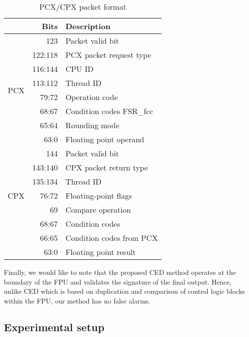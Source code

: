 \documentclass[12pt]{yalephd}
\begin{document}
\begin{table}[!ht]
\caption{PCX/CPX packet format}\label{sC3tPCXCPXPacket}
\begin{center}
\begin{threeparttable}[b]
\begin{tabular}{||r|r|l||}
\hline
\hline
& {\bf Bits} & {\bf Description} \\
\hline
\hline
\multirow{8}{*}{PCX} & 123 & Packet valid bit \\
\cline{2-3}
& 122:118 & PCX packet request type\\
\cline{2-3}
& 116:144 & CPU ID \\
\cline{2-3}
& 113:112 & Thread ID \\
\cline{2-3}
& 79:72 & Operation code \\
\cline{2-3}
& 68:67 & Condition codes FSR\_fcc \\
\cline{2-3}
& 65:64 & Rounding mode \\
\cline{2-3}
& 63:0 & Floating point operand \\
\hline
\multirow{7}{*}{CPX} & 144 & Packet valid bit \\
\cline{2-3}
& 143:140 & CPX packet return type\\
\cline{2-3}
& 135:134 & Thread ID \\
\cline{2-3}
& 76:72 & Floating-point flags\\
\cline{2-3}
& 69 & Compare operation \\
\cline{2-3}
& 68:67 & Condition codes \\
\cline{2-3}
& 66:65 & Condition codes from PCX \\
\cline{2-3}
& 63:0 & Floating point result \\
\hline
\hline
\end{tabular}
\end{threeparttable}
\end{center}
\end{table}

Finally, we would like to note that the proposed CED method operates at the boundary of the FPU and validates the signature of the final output. Hence, unlike CED which is based on duplication and comparison of control logic blocks within the FPU, our method has no false alarms.

\subsection{Experimental setup}\label{sC3sExpSetup}
\end{document}
